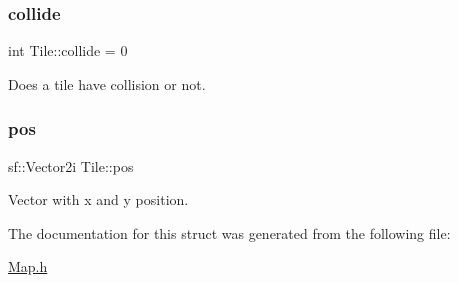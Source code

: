 \subsubsection{\texorpdfstring{collide}{collide}}
{\footnotesize\ttfamily int Tile\+::collide = 0}

Does a tile have collision or not. \mbox{\label{structTile_acf7dda9a45f387cff4fe0ae26ad87340}} 
\subsubsection{\texorpdfstring{pos}{pos}}
{\footnotesize\ttfamily sf\+::\+Vector2i Tile\+::pos}

Vector with x and y position. 

The documentation for this struct was generated from the following file\+:\begin{DoxyCompactItemize}
\item 
\mbox{\hyperlink{Map_8h}{Map.\+h}}\end{DoxyCompactItemize}
